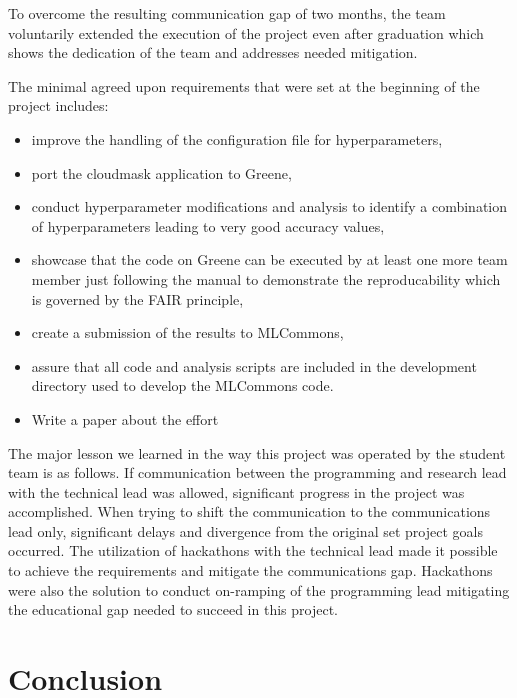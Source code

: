 \documentclass[sigplan,screen]{acmart}
\begin{document}
To overcome the resulting communication gap of two months, the team voluntarily extended the execution of the project even after graduation which shows the dedication of the team and addresses needed mitigation.

The minimal agreed upon requirements that were set at the beginning of the project includes:

\begin{itemize}

\item improve the handling of the configuration file for hyperparameters,
\item port the cloudmask application to Greene,
\item conduct hyperparameter modifications and analysis to identify a combination of  hyperparameters leading to very good accuracy values,
\item showcase that the code on Greene can be executed by at least one more team member just following the manual to demonstrate the reproducability which is governed by the FAIR \cite{} principle,
\item create a submission of the results to MLCommons,
\item assure that all code and analysis scripts are included in the development directory used to develop the MLCommons code. 
\item Write a paper about the effort

\end{itemize}

The major lesson we learned in the way this project was operated by the student team is as follows.  If communication between the programming and research lead with the technical lead was allowed, significant progress in the project was accomplished. When trying to shift the communication to the communications lead only, significant delays and divergence from the original set project goals occurred. The utilization of hackathons with the technical lead made it possible to achieve the requirements and mitigate the communications gap. Hackathons were also the solution to conduct on-ramping of the programming lead mitigating the educational gap needed to succeed in this project.

\section{Conclusion}
\label{sec:conclusion}

\end{document}
